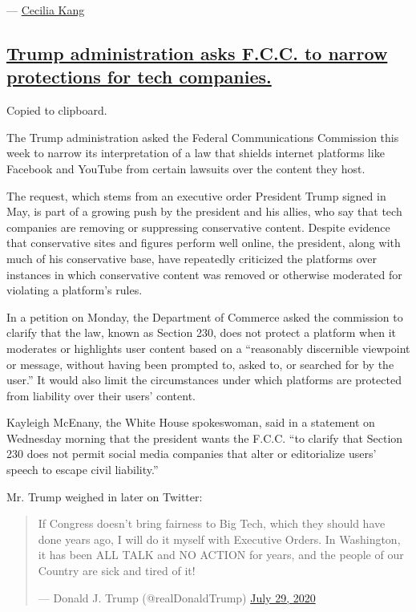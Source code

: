 --- \href{https://www.nytimes.com/by/cecilia-kang}{Cecilia Kang}

\hypertarget{trump-administration-asks-fcc-to-narrow-protections-for-tech-companies}{%
\subsection{\texorpdfstring{\protect\hyperlink{trump-administration-asks-fcc-to-narrow-protections-for-tech-companies}{Trump
administration asks F.C.C. to narrow protections for tech
companies.}}{Trump administration asks F.C.C. to narrow protections for tech companies.}}\label{trump-administration-asks-fcc-to-narrow-protections-for-tech-companies}}

Copied to clipboard.

The Trump administration asked the Federal Communications Commission
this week to narrow its interpretation of a law that shields internet
platforms like Facebook and YouTube from certain lawsuits over the
content they host.

The request, which stems from an executive order President Trump signed
in May, is part of a growing push by the president and his allies, who
say that tech companies are removing or suppressing conservative
content. Despite evidence that conservative sites and figures perform
well online, the president, along with much of his conservative base,
have repeatedly criticized the platforms over instances in which
conservative content was removed or otherwise moderated for violating a
platform's rules.

In a petition on Monday, the Department of Commerce asked the commission
to clarify that the law, known as Section 230, does not protect a
platform when it moderates or highlights user content based on a
``reasonably discernible viewpoint or message, without having been
prompted to, asked to, or searched for by the user.'' It would also
limit the circumstances under which platforms are protected from
liability over their users' content.

Kayleigh McEnany, the White House spokeswoman, said in a statement on
Wednesday morning that the president wants the F.C.C. ``to clarify that
Section 230 does not permit social media companies that alter or
editorialize users' speech to escape civil liability.''

Mr. Trump weighed in later on Twitter:

\begin{quote}
If Congress doesn't bring fairness to Big Tech, which they should have
done years ago, I will do it myself with Executive Orders. In
Washington, it has been ALL TALK and NO ACTION for years, and the people
of our Country are sick and tired of it!

--- Donald J. Trump (@realDonaldTrump)
\href{https://twitter.com/realDonaldTrump/status/1288506554585505793?ref_src=twsrc\%5Etfw}{July
29, 2020}
\end{quote}

